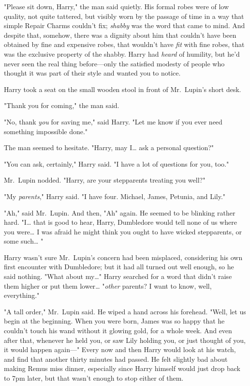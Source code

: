 "Please sit down, Harry," the man said quietly. His formal robes were of low
quality, not quite tattered, but visibly worn by the passage of time in a way
that simple Repair Charms couldn't fix; \emph{shabby} was the word that came to
mind. And despite that, somehow, there was a dignity about him that couldn't
have been obtained by fine and expensive robes, that wouldn't have \emph{fit}
with fine robes, that was the exclusive property of the shabby. Harry had
\emph{heard} of humility, but he'd never seen the real thing before---only the
satisfied modesty of people who thought it was part of their style and wanted
you to notice.

Harry took a seat on the small wooden stool in front of Mr.~Lupin's short desk.

"Thank you for coming," the man said.

"No, thank \emph{you} for saving me," said Harry. "Let me know if you ever need
something impossible done."

The man seemed to hesitate. "Harry, may I{\ldots} ask a personal question?"

"You can ask, certainly," Harry said. "I have a lot of questions for you, too."

Mr.~Lupin nodded. "Harry, are your stepparents treating you well?"

"My \emph{parents}," Harry said. "I have four. Michael, James, Petunia, and
Lily."

"Ah," said Mr.~Lupin. And then, "Ah" again. He seemed to be blinking rather
hard. "I{\ldots} that is good to hear, Harry, Dumbledore would tell none of us
where you were{\ldots} I was afraid he might think you ought to have wicked
stepparents, or some such{\ldots} "

Harry wasn't sure Mr.~Lupin's concern had been misplaced, considering his own
first encounter with Dumbledore; but it had all turned out well enough, so he
said nothing. "What about my{\ldots}" Harry searched for a word that didn't
raise them higher or put them lower{\ldots} "\emph{other} parents? I want to
know, well, everything."

"A tall order," Mr.~Lupin said. He wiped a hand across his forehead. "Well, let
us begin at the beginning. When you were born, James was so happy that he
couldn't touch his wand without it glowing gold, for a whole week. And even
after that, whenever he held you, or saw Lily holding you, or just thought of
you, it would happen again---"
\later
Every now and then Harry would look at his watch, and find that another thirty
minutes had passed. He felt slightly bad about making Remus miss dinner,
especially since Harry himself would just drop back to 7pm later, but that
wasn't enough to stop either of them.

